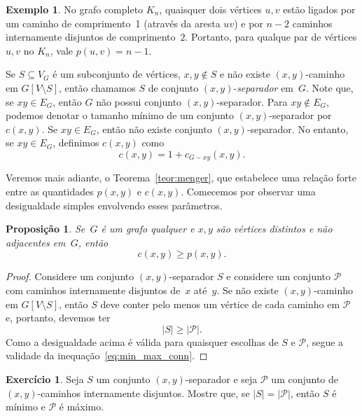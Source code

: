 \documentclass[12pt, a4paper]{article}
\newtheorem{prop}[teor]{Proposição}
\theoremstyle{definition}
\newtheorem{exem}[teor]{Exemplo}
\newtheorem{exer}{Exercício}
\begin{document}
\begin{exem}
No grafo completo $K_n$, quaisquer dois vértices $u,v$ estão ligados por um caminho de comprimento~1 (através da aresta $uv$) e por $n-2$ caminhos internamente disjuntos de comprimento~$2$. Portanto, para qualque par de vértices $u,v$ no $K_n$, vale $p(u,v) = n - 1$.
\end{exem}

Se $S \subseteq V_G$ é um subconjunto de vértices, $x,y \not\in S$ e não existe $(x,y)$-caminho em $G[V \setminus S]$, então chamamos $S$ de conjunto $(x,y)$-\emph{separador} em~$G$. Note que, se $xy \in E_G$, então $G$ não possui conjunto $(x,y)$-separador. Para $xy \not\in E_G$, podemos denotar o tamanho mínimo de um conjunto $(x,y)$-separador por $c(x,y)$. Se $xy \in E_G$, então não existe conjunto $(x,y)$-separador. No entanto, se $xy \in E_G$, definimos $c(x,y)$ como 
\begin{equation}
  \label{eq:c_adjacent}
   c(x,y) = 1 + c_{G - xy}(x,y). 
\end{equation}

Veremos mais adiante, o Teorema~\ref{teor:menger}, que estabelece uma relação forte entre as quantidades $p(x,y)$ e $c(x,y)$. Comecemos por observar uma desigualdade simples envolvendo esses parâmetros. 

\begin{prop} 
\label{prop:easy_ineq_menger}
Se~$G$ é um grafo qualquer e $x,y$ são vértices distintos e não adjacentes em~$G$, então
  \begin{equation}
    \label{eq:min_max_conn}
     c(x,y) \geq p(x,y).
  \end{equation}
\end{prop}

\begin{proof}
Considere um conjunto $(x,y)$-separador $S$ e considere um conjunto $\mathcal{P}$ com caminhos internamente disjuntos de~$x$ até~$y$. Se não existe $(x,y)$-caminho em $G[V \setminus S]$, então $S$ deve conter pelo menos um vértice de cada caminho em $\mathcal{P}$ e, portanto, devemos ter 
\[ |S| \geq |\mathcal{P}|. \]
Como a desigualdade acima é válida para quaisquer escolhas de $S$ e $\mathcal{P}$, segue a validade da inequação~\eqref{eq:min_max_conn}.
\end{proof}

\begin{exer}
\label{exer:min_max}
Seja $S$ um conjunto $(x,y)$-separador e seja $\mathcal{P}$ um conjunto de $(x,y)$-caminhos internamente disjuntos. Mostre que, se $|S| = |\mathcal{P}|$, então $S$ é mínimo e $\mathcal{P}$ é máximo.
\end{exer}
\end{document}
